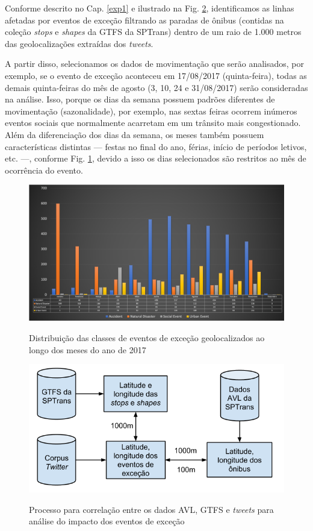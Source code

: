 \documentclass[
	12pt,				%
	oneside,			%
	a4paper,			%
	english,			%
	brazil				%
	]{abntex2ppgsi}
\begin{document}
{{Conforme descrito no Cap. \ref{exp1} e ilustrado na Fig. \ref{fig:avl_tweets_correlation_pt}, identificamos as linhas afetadas por eventos de exceção filtrando as paradas de ônibus (contidas na coleção \textit{stops}  e \textit{shapes} da GTFS da SPTrans) dentro de um raio de 1.000 metros das geolocalizações extraídas dos \textit{tweets}. 

A partir disso, selecionamos os dados de movimentação que serão analisados, por exemplo, se o evento de exceção aconteceu em 17/08/2017 (quinta-feira), todas as demais quinta-feiras do mês de agosto (3, 10, 24 e 31/08/2017) serão consideradas na análise. Isso, porque os dias da semana possuem padrões diferentes de movimentação (sazonalidade), por exemplo, nas sextas feiras ocorrem inúmeros eventos sociais que normalmente acarretam em um trânsito mais congestionado. Além da diferenciação dos dias da semana, os meses também possuem características distintas --- festas no final do ano, férias, início de períodos letivos, etc. ---, conforme Fig. \ref{fig:exception_events_classification_distribution}, devido a isso os dias selecionados são restritos ao mês de ocorrência do evento.

\begin{figure}[!htb]
	\centering
 	  \caption{Distribuição das classes de eventos de exceção geolocalizados ao longo dos meses do ano de 2017}
		\includegraphics[width=1\linewidth]{images/exception_events_classification_distribution.png}
	\label{fig:exception_events_classification_distribution}
\end{figure}

\begin{figure}[!htb]
	\centering
 	  \caption{Processo para correlação entre os dados AVL, GTFS e \textit{tweets} para análise do impacto dos eventos de exceção}
		\includegraphics[width=0.7\linewidth]{images/avl_tweets_correlation_pt.png}
	\label{fig:avl_tweets_correlation_pt}
\end{figure}

}}
\end{document}
